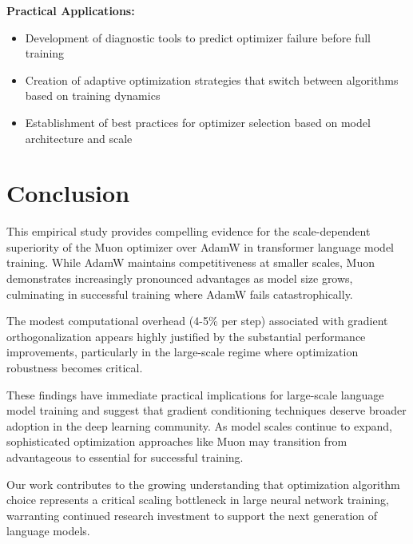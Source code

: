 \documentclass[11pt,a4paper]{article}
\begin{document}
\textbf{Practical Applications:}
\begin{itemize}[leftmargin=*]
    \item Development of diagnostic tools to predict optimizer failure before full training
    \item Creation of adaptive optimization strategies that switch between algorithms based on training dynamics
    \item Establishment of best practices for optimizer selection based on model architecture and scale
\end{itemize}

\section{Conclusion}

This empirical study provides compelling evidence for the scale-dependent superiority of the Muon optimizer over AdamW in transformer language model training. While AdamW maintains competitiveness at smaller scales, Muon demonstrates increasingly pronounced advantages as model size grows, culminating in successful training where AdamW fails catastrophically.

The modest computational overhead (4-5\% per step) associated with gradient orthogonalization appears highly justified by the substantial performance improvements, particularly in the large-scale regime where optimization robustness becomes critical.

These findings have immediate practical implications for large-scale language model training and suggest that gradient conditioning techniques deserve broader adoption in the deep learning community. As model scales continue to expand, sophisticated optimization approaches like Muon may transition from advantageous to essential for successful training.

Our work contributes to the growing understanding that optimization algorithm choice represents a critical scaling bottleneck in large neural network training, warranting continued research investment to support the next generation of language models.
\end{document}

